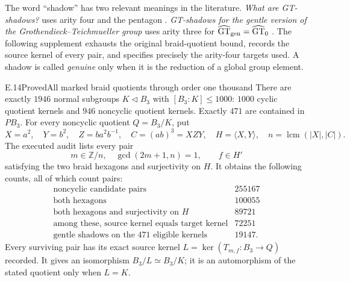 The word ``shadow'' has two relevant meanings in the literature.
\emph{What are GT-shadows?} uses arity four and the pentagon
\citep{DolgushevLeLorenz2024}.
\emph{GT-shadows for the gentle version of the
Grothendieck--Teichmueller group} uses arity three for
$\widehat{\mathrm{GT}}_{\rm gen}=\widehat{\mathrm{GT}}_0$
\citep{DolgushevGuynee2024}.
The following supplement exhausts the original braid-quotient bound,
records the source kernel of every pair, and specifies precisely the
arity-four targets used. A shadow is called \emph{genuine} only when
it is the reduction of a global group element.

\begin{statement}{E.14}{Proved}{All marked braid quotients through order one thousand}
There are exactly $1946$ normal subgroups $K\triangleleft B_3$ with
$[B_3:K]\leq1000$: $1000$ cyclic quotient kernels and $946$
noncyclic quotient kernels. Exactly $471$ are contained in $PB_3$.
For every noncyclic quotient $Q=B_3/K$, put
\[
 X=a^2,\quad Y=b^2,\quad Z=ba^2b^{-1},\quad C=(ab)^3= XZY,
 \quad H=\langle X,Y\rangle,
 \quad n=\operatorname{lcm}(|X|,|C|).
\]
The executed audit lists every pair
\[
 m\in\mathbb Z/n,\quad \gcd(2m+1,n)=1,
 \qquad f\in H'
\]
satisfying the two braid hexagons and surjectivity on $H$.
It obtains the following counts, all of which count pairs:
\[
\begin{array}{l|r}
\text{noncyclic candidate pairs}&255167\\
\text{both hexagons}&100055\\
\text{both hexagons and surjectivity on }H&89721\\
\text{among these, source kernel equals target kernel}&72251\\
\text{gentle shadows on the }471\text{ eligible kernels}&19147.
\end{array}
\]
Every surviving pair has its exact source kernel
$L=\ker(T_{m,f}:B_3\to Q)$ recorded. It gives an isomorphism
$B_3/L\simeq B_3/K$; it is an automorphism of the stated quotient
only when $L=K$.
\end{statement}
